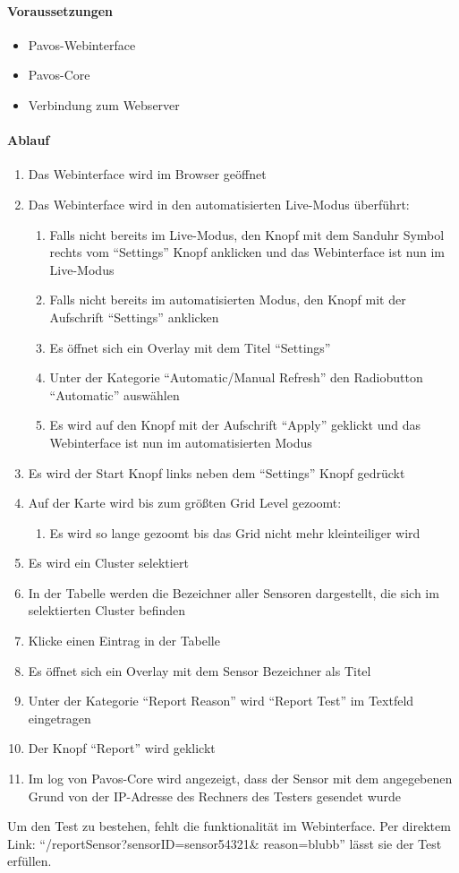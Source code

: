 \paragraph{Voraussetzungen}
\begin{itemize}
\item Pavos-Webinterface
\item Pavos-Core
\item Verbindung zum Webserver
\end{itemize}
\paragraph{Ablauf}
\begin{enumerate}
\item Das Webinterface wird im Browser geöffnet
\item Das Webinterface wird in den automatisierten Live-Modus überführt:
\begin{enumerate}
\item Falls nicht bereits im Live-Modus, den Knopf mit dem Sanduhr Symbol rechts vom ``Settings'' Knopf anklicken und das Webinterface ist nun im Live-Modus
\item Falls nicht bereits im automatisierten Modus, den Knopf mit der Aufschrift ``Settings'' anklicken
\item Es öffnet sich ein Overlay mit dem Titel ``Settings''
\item Unter der Kategorie ``Automatic/Manual Refresh'' den Radiobutton ``Automatic'' auswählen
\item Es wird auf den Knopf mit der Aufschrift ``Apply'' geklickt und das Webinterface ist nun im automatisierten Modus
\end{enumerate} 
\item Es wird der Start Knopf links neben dem ``Settings'' Knopf gedrückt
\item Auf der Karte wird bis zum größten Grid Level gezoomt:
\begin{enumerate}
\item Es wird so lange gezoomt bis das Grid nicht mehr kleinteiliger wird
\end{enumerate}
\item Es wird ein Cluster selektiert
\item In der Tabelle werden die Bezeichner aller Sensoren dargestellt, die sich im selektierten Cluster befinden
\item Klicke einen Eintrag in der Tabelle
\item Es öffnet sich ein Overlay mit dem Sensor Bezeichner als Titel
\item Unter der Kategorie ``Report Reason'' wird ``Report Test'' im Textfeld eingetragen
\item Der Knopf ``Report'' wird geklickt
\item Im log von Pavos-Core wird angezeigt, dass der Sensor mit dem angegebenen Grund von der IP-Adresse des Rechners des Testers gesendet wurde
\end{enumerate}
\szenarioBad
Um den Test zu bestehen, fehlt die funktionalität im Webinterface.
Per direktem Link: ``/reportSensor?sensorID=sensor54321\& reason=blubb'' lässt sie der Test erfüllen.

